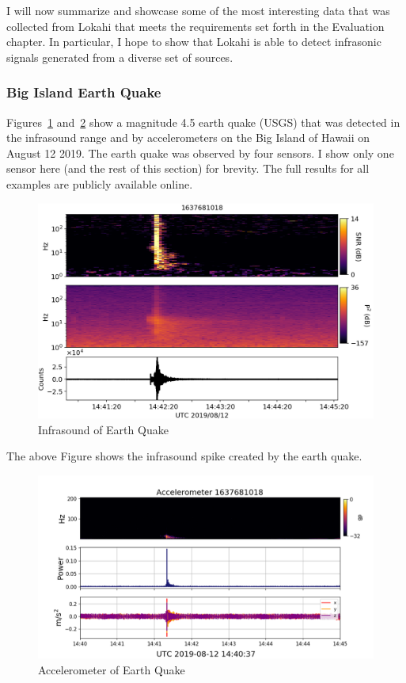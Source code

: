 I will now summarize and showcase some of the most interesting data that was collected from Lokahi that meets the requirements set forth in the Evaluation chapter. In particular, I hope to show that Lokahi is able to detect infrasonic signals generated from a diverse set of sources.


\subsubsection{Big Island Earth Quake}
Figures~\ref{fig:quake_1} and~\ref{fig:quake_2} show a magnitude 4.5 earth quake (USGS\cite{usgs_quake}) that was detected in the infrasound range and by accelerometers on the Big Island of Hawaii on August 12 2019. The earth quake was observed by four sensors. I show only one sensor here (and the rest of this section) for brevity. The full results for all examples are publicly available online\cite{redvox_reports}.

\begin{figure}[H]
    \centering
    \includegraphics[width=\linewidth]{figures/quake_1.png}
    \caption{Infrasound of Earth Quake}
    \label{fig:quake_1}
\end{figure}

The above Figure shows the infrasound spike created by the earth quake.

\begin{figure}[H]
    \centering
    \includegraphics[width=\linewidth]{figures/quake_2.png}
    \caption{Accelerometer of Earth Quake}
    \label{fig:quake_2}
\end{figure}

